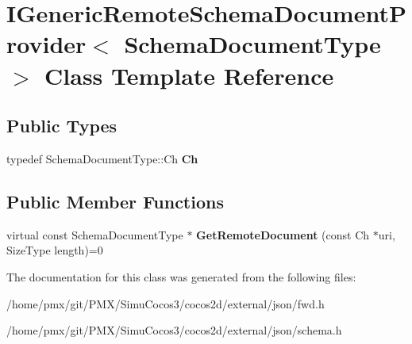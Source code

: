\hypertarget{classIGenericRemoteSchemaDocumentProvider}{}\section{I\+Generic\+Remote\+Schema\+Document\+Provider$<$ Schema\+Document\+Type $>$ Class Template Reference}
\label{classIGenericRemoteSchemaDocumentProvider}
\subsection*{Public Types}
\begin{DoxyCompactItemize}
\item 
\mbox{\label{classIGenericRemoteSchemaDocumentProvider_acfcd5492c3df8ff56cd2d84d36cc0ceb}} 
typedef Schema\+Document\+Type\+::\+Ch {\bfseries Ch}
\end{DoxyCompactItemize}
\subsection*{Public Member Functions}
\begin{DoxyCompactItemize}
\item 
\mbox{\label{classIGenericRemoteSchemaDocumentProvider_aad112a069dd57fe850fafd04cbb4777b}} 
virtual const Schema\+Document\+Type $\ast$ {\bfseries Get\+Remote\+Document} (const Ch $\ast$uri, Size\+Type length)=0
\end{DoxyCompactItemize}


The documentation for this class was generated from the following files\+:\begin{DoxyCompactItemize}
\item 
/home/pmx/git/\+P\+M\+X/\+Simu\+Cocos3/cocos2d/external/json/fwd.\+h\item 
/home/pmx/git/\+P\+M\+X/\+Simu\+Cocos3/cocos2d/external/json/schema.\+h\end{DoxyCompactItemize}
